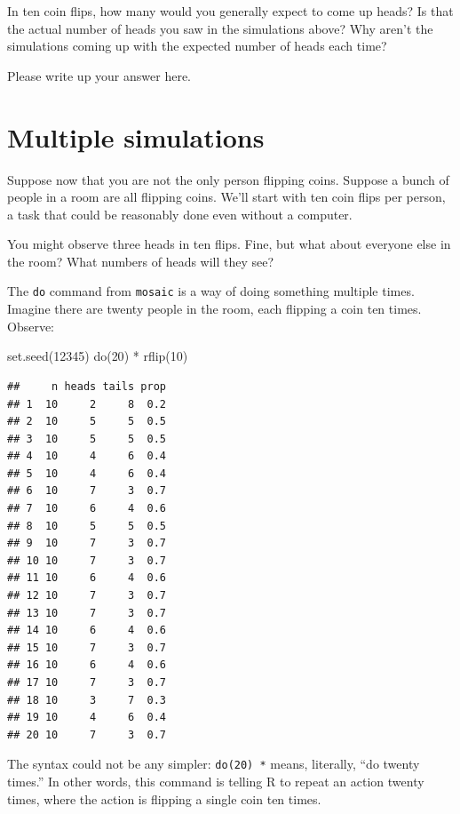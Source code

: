 \documentclass[
]{book}
\newenvironment{Shaded}{\begin{snugshade}}{\end{snugshade}}
\newcommand{\DecValTok}[1]{\textcolor[rgb]{0.00,0.00,0.81}{#1}}
\newcommand{\FunctionTok}[1]{\textcolor[rgb]{0.00,0.00,0.00}{#1}}
\newcommand{\NormalTok}[1]{#1}
\newcommand{\SpecialCharTok}[1]{\textcolor[rgb]{0.00,0.00,0.00}{#1}}
\begin{document}
In ten coin flips, how many would you generally expect to come up heads? Is that the actual number of heads you saw in the simulations above? Why aren't the simulations coming up with the expected number of heads each time?

Please write up your answer here.

\hypertarget{randomization1-multiple}{%
\section{Multiple simulations}\label{randomization1-multiple}}

Suppose now that you are not the only person flipping coins. Suppose a bunch of people in a room are all flipping coins. We'll start with ten coin flips per person, a task that could be reasonably done even without a computer.

You might observe three heads in ten flips. Fine, but what about everyone else in the room? What numbers of heads will they see?

The \texttt{do} command from \texttt{mosaic} is a way of doing something multiple times. Imagine there are twenty people in the room, each flipping a coin ten times. Observe:

\begin{Shaded}
\begin{Highlighting}[]
\FunctionTok{set.seed}\NormalTok{(}\DecValTok{12345}\NormalTok{)}
\FunctionTok{do}\NormalTok{(}\DecValTok{20}\NormalTok{) }\SpecialCharTok{*} \FunctionTok{rflip}\NormalTok{(}\DecValTok{10}\NormalTok{)}
\end{Highlighting}
\end{Shaded}

\begin{verbatim}
##     n heads tails prop
## 1  10     2     8  0.2
## 2  10     5     5  0.5
## 3  10     5     5  0.5
## 4  10     4     6  0.4
## 5  10     4     6  0.4
## 6  10     7     3  0.7
## 7  10     6     4  0.6
## 8  10     5     5  0.5
## 9  10     7     3  0.7
## 10 10     7     3  0.7
## 11 10     6     4  0.6
## 12 10     7     3  0.7
## 13 10     7     3  0.7
## 14 10     6     4  0.6
## 15 10     7     3  0.7
## 16 10     6     4  0.6
## 17 10     7     3  0.7
## 18 10     3     7  0.3
## 19 10     4     6  0.4
## 20 10     7     3  0.7
\end{verbatim}

The syntax could not be any simpler: \texttt{do(20)\ *} means, literally, ``do twenty times.'' In other words, this command is telling R to repeat an action twenty times, where the action is flipping a single coin ten times.
\end{document}

